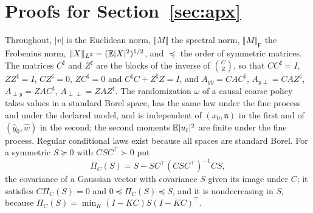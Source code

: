 \section{Proofs for \texorpdfstring{Section~\ref{sec:apx}}{approximate meta-agents}}\label{app:apx}

Throughout, $\lvert v\rvert$ is the Euclidean norm, $\Vert M\Vert$ the spectral norm, $\Vert M\Vert_{\mathrm F}$ the Frobenius norm, $\Vert X\Vert_{L^2}=(\mathbb{E}\lvert X\rvert^2)^{1/2}$, and $\preceq$ the order of symmetric matrices. The matrices $C^\sharp$ and $Z^\sharp$ are the blocks of the inverse of $\binom CZ$, so that $CC^\sharp=I$, $ZZ^\sharp=I$, $CZ^\sharp=0$, $ZC^\sharp=0$ and $C^\sharp C+Z^\sharp Z=I$, and $A_{yy}=CAC^\sharp$, $A_{y\perp}=CAZ^\sharp$, $A_{\perp y}=ZAC^\sharp$, $A_{\perp\perp}=ZAZ^\sharp$. The randomization $\omega$ of a causal coarse policy takes values in a standard Borel space, has the same law under the fine process and under the declared model, and is independent of $(x_0,\mathfrak n)$ in the first and of $(\hat y_0,\hat w)$ in the second; the second moments $\mathbb{E}\lvert u_t\rvert^2$ are finite under the fine process. Regular conditional laws exist because all spaces are standard Borel. For a symmetric $S\succeq0$ with $CSC^\top\succ0$ put
\begin{equation}\label{eq:apx-condition-map}
\Pi_C(S)=S-SC^\top(CSC^\top)^{-1}CS ,
\end{equation}
the covariance of a Gaussian vector with covariance $S$ given its image under $C$; it satisfies $C\Pi_C(S)=0$ and $0\preceq\Pi_C(S)\preceq S$, and it is nondecreasing in $S$, because $\Pi_C(S)=\min_K(I-KC)S(I-KC)^\top$.

